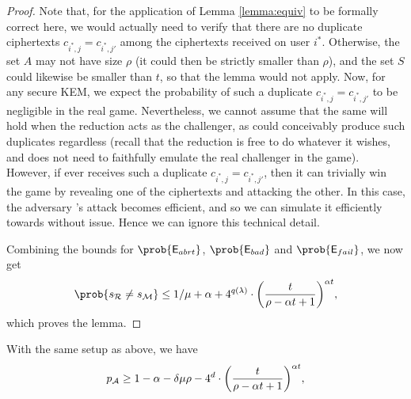 \begin{proof}
  Note that, for the application of Lemma \ref{lemma:equiv} to be formally correct here,
  we would actually need to verify that there are no duplicate ciphertexts
  \(c_{i^{*},j} = c_{i^{*},j'}\) among the ciphertexts received on user \(i^{*}\).
  Otherwise, the set \(A\) may not have size \(\rho\)
  (it could then be strictly smaller than \(\rho\)),
  and the set \(S\) could likewise be smaller than \(t\),
  so that the lemma would not apply.
  Now, for any secure KEM, we expect the probability of such a
  duplicate \(c_{i^{*},j} = c_{i^{*},j'}\) to be negligible in the real \OWECPA game.
  Nevertheless, we cannot assume that the same will hold
  when the reduction \redR acts as the challenger,
  as \redR could conceivably produce such duplicates regardless
  (recall that the reduction is free to do whatever it wishes, and does not need to
  faithfully emulate the real challenger in the \OWECPA game).
  However, if \advA ever receives such a duplicate \(c_{i^{*},j} = c_{i^{*},j'}\),
  then it can trivially win the \OWECPA game by revealing one of the ciphertexts and attacking the other.
  In this case, the adversary \advA's attack becomes efficient,
  and so we can simulate it efficiently towards \redR without issue.
  Hence we can ignore this technical detail.

  Combining the bounds for \(\prob{\eventE_{abrt}}\), \(\prob{\eventE_{bad}}\) and \(\prob{\eventE_{fail}}\), we now get
  \[
    \prob{s_{\redR} \ne s_{\redM}} \le 1 / \mu + \alpha
    + 4^{q(\lambda)} \cdot \left( \frac{t}{\rho - \alpha t + 1} \right)^{\alpha t},
  \]
  which proves the lemma.
\end{proof}

\begin{lemma}\label{lemma:A}
  With the same setup as above, we have
  \begin{equation}
    p_{\advA} \ge 1 - \alpha - \delta \mu \rho
    - 4^{d} \cdot \left( \frac{t}{\rho - \alpha t + 1} \right)^{\alpha t},
  \end{equation}
\end{lemma}


